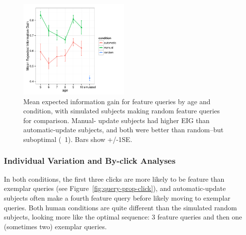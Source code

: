 \documentclass[10pt,letterpaper]{article}
\begin{document}
\begin{figure}[t]
  \centering
  \includegraphics[width=0.49\textwidth]{figures/EIG_by_age_n_condition}
  \caption{Mean expected information gain for feature queries by age and condition, 
with simulated subjects making random feature queries for comparison. Manual-
update subjects had higher EIG than automatic-update subjects, and both were 
better than random--but suboptimal (~1). Bars show +/-1SE.}
  \label{fig:EIG_by_age}
\end{figure} 



\subsubsection{Individual Variation and By-click Analyses}



In both conditions, the first three clicks are more likely to be feature than exemplar 
queries (see Figure~\ref{fig:query-prop-click}), and automatic-update subjects often 
make a fourth feature query before likely moving to exemplar queries. Both human 
conditions are quite different than the simulated random subjects, looking more like 
the optimal sequence: 3 feature queries and then one (sometimes two) exemplar 
queries. 
\end{document}
